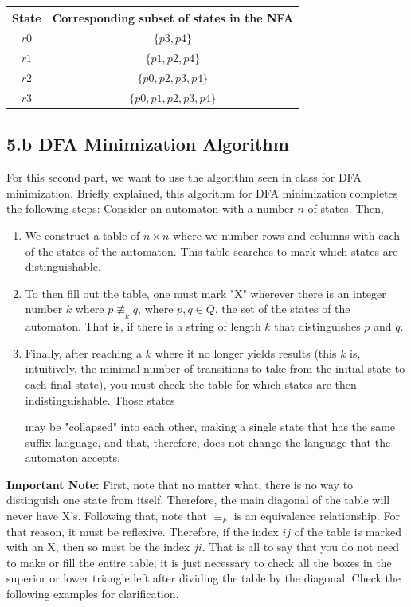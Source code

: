 \documentclass[12pt]{article}
\begin{document}
\begin{center}
\begin{tabular}{|c|c|}
    \hline
    State & Corresponding subset of states in the NFA \\
    \hline
    $r0$ & $\{p3, p4\}$ \\
    $r1$ & $\{p1, p2, p4\}$ \\
    $r2$ & $\{p0, p2, p3, p4\}$ \\
    $r3$ & $\{p0, p1, p2, p3, p4\}$ \\
    \hline
\end{tabular}
\end{center}

\subsection*{5.b DFA Minimization Algorithm}

For this second part, we want to use the algorithm seen in class for DFA minimization. Briefly explained, this algorithm for DFA minimization completes the following steps: Consider an automaton with a number $n$ of states. Then,

\begin{enumerate}
    \item We construct a table of $n \times n$ where we number rows and columns with each of the states of the automaton. This table searches to mark which states are distinguishable.
    
    \item To then fill out the table, one must mark "X" wherever there is an integer number $k$ where $p \not\equiv_k q$, where $p, q \in Q$, the set of the states of the automaton. That is, if there is a string of length $k$ that distinguishes $p$ and $q$.
    
    \item Finally, after reaching a $k$ where it no longer yields results (this $k$ is, intuitively, the minimal number of transitions to take from the initial state to each final state), you must check the table for which states are then indistinguishable. Those states

 may be "collapsed" into each other, making a single state that has the same suffix language, and that, therefore, does not change the language that the automaton accepts.
\end{enumerate}

\textbf{Important Note:} First, note that no matter what, there is no way to distinguish one state from itself. Therefore, the main diagonal of the table will never have X's. Following that, note that $\equiv_k$ is an equivalence relationship. For that reason, it must be reflexive. Therefore, if the index $ij$ of the table is marked with an X, then so must be the index $ji$. That is all to say that you do not need to make or fill the entire table; it is just necessary to check all the boxes in the superior or lower triangle left after dividing the table by the diagonal. Check the following examples for clarification.
\end{document}
